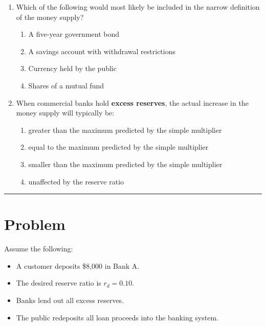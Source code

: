 \documentclass[12pt]{article}
\begin{document}
\begin{enumerate}[label=\textbf{\arabic*.}]
\item Which of the following would most likely be included in the narrow definition of the money supply?
\begin{enumerate}[label=(\Alph*)]
    \item A five-year government bond
    \item A savings account with withdrawal restrictions
    \item Currency held by the public
    \item Shares of a mutual fund
\end{enumerate}
\newpage
\item When commercial banks hold \textbf{excess reserves}, the actual increase in the money supply will typically be:
\begin{enumerate}[label=(\Alph*)]
    \item greater than the maximum predicted by the simple multiplier
    \item equal to the maximum predicted by the simple multiplier
    \item smaller than the maximum predicted by the simple multiplier
    \item unaffected by the reserve ratio
\end{enumerate}

\end{enumerate}

\hrule
\vspace{1em}

\section*{ Problem }



Assume the following:
\begin{itemize}
    \item A customer deposits \$8{,}000 in Bank A.
    \item The desired reserve ratio is \(r_d = 0.10\).
    \item Banks lend out all excess reserves.
    \item The public redeposits all loan proceeds into the banking system.
\end{itemize}
\end{document}
